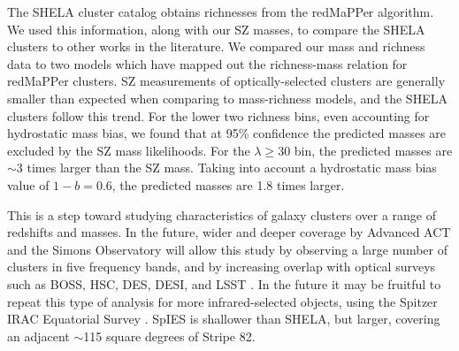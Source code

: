 \documentclass[a4paper,fleqn,usenatbib]{mnras}
\begin{document}

The SHELA cluster catalog obtains richnesses from the redMaPPer algorithm. We used this information, along with our SZ masses, to compare the SHELA clusters to other works in the literature. 
We compared our mass and richness data to two models which have mapped out the richness-mass relation for redMaPPer clusters. SZ measurements of optically-selected clusters are generally smaller than expected when comparing to mass-richness models, and the SHELA clusters follow this trend. For the lower two richness bins, even accounting for hydrostatic mass bias, we found that at 95\% confidence the predicted masses are excluded by the SZ mass likelihoods. For the $\lambda \geq 30$ bin, the predicted masses are $\sim$3 times larger than the SZ mass. Taking into account a hydrostatic mass bias value of $1-b = 0.6$, the predicted masses are 1.8 times larger.

This is a step toward studying characteristics of galaxy clusters over a range of redshifts and masses. In the future, wider and deeper coverage by Advanced ACT and the Simons Observatory will allow this study by observing a large number of clusters in five frequency bands, and by increasing overlap with optical surveys such as BOSS, HSC, DES, DESI, and LSST \citep{2016SPIE.9910E..14D}. In the future it may be fruitful to repeat this type of analysis for more infrared-selected objects, using the Spitzer IRAC Equatorial Survey \citep[SpIES,][]{2016ApJS..225....1T}. SpIES is shallower than SHELA, but larger, covering an adjacent $\sim$115 square degrees of Stripe 82.
\end{document}

